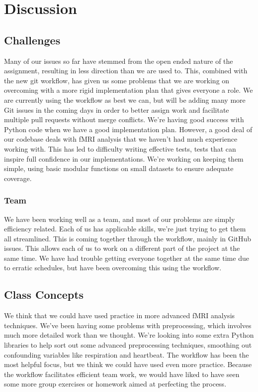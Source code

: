 \documentclass[11pt]{article}
\begin{document}
\section{Discussion}

\subsection{Challenges}

Many of our issues so far have stemmed from the open ended nature of the
assignment, resulting in less direction than we are used to. This, combined
with the new git workflow, has given us some problems that we are working on
overcoming with a more rigid implementation plan that gives everyone a role.
We are currently using the workflow as best we can, but will be adding many
more Git issues in the coming days in order to better assign work and
facilitate multiple pull requests without merge conflicts. We're having good
success with Python code when we have a good implementation plan. However, a
good deal of our codebase deals with fMRI analysis that we haven't had much
experience working with. This has led to difficulty writing effective tests,
tests that can inspire full confidence in our implementations. We're working on
keeping them simple, using basic modular functions on small datasets to ensure
adequate coverage.

\subsubsection{Team}

We have been working well as a team, and most of our problems are simply
efficiency related. Each of us has applicable skills, we're just trying to get
them all streamlined. This is coming together through the workflow, mainly in
GitHub issues. This allows each of us to work on a different part of the
project at the same time. We have had trouble getting everyone together at the
same time due to erratic schedules, but have been overcoming this using the
workflow.

\subsection{Class Concepts}

We think that we could have used practice in more advanced fMRI analysis
techniques. We've been having some problems with preprocessing, which involves
much more detailed work than we thought. We're looking into some extra Python
libraries to help sort out some advanced preprocessing techniques, smoothing
out confounding variables like respiration and heartbeat. The workflow has been
the most helpful focus, but we think we could have used even more practice.
Because the workflow facilitates efficient team work, we would have liked to
have seen some more group exercises or homework aimed at perfecting the
process.


\end{document}
